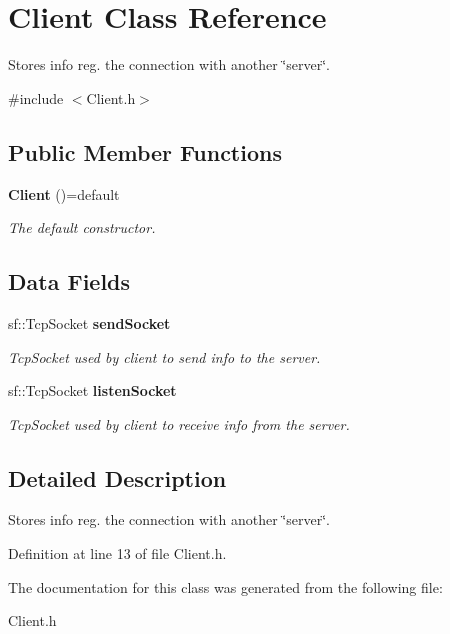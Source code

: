 \section{Client Class Reference}
\label{classClient}


Stores info reg. the connection with another \char`\"{}server\char`\"{}.  




{\ttfamily \#include $<$Client.\+h$>$}

\subsection*{Public Member Functions}
\begin{DoxyCompactItemize}
\item 
{\bf Client} ()=default\label{classClient_ac13ad1e98c47db57ce0823dc735261cd}

\begin{DoxyCompactList}\small\item\em The default constructor. \end{DoxyCompactList}\end{DoxyCompactItemize}
\subsection*{Data Fields}
\begin{DoxyCompactItemize}
\item 
sf\+::\+Tcp\+Socket {\bf send\+Socket}\label{classClient_a08b3297842eb2b464d275ef591f9cc73}

\begin{DoxyCompactList}\small\item\em Tcp\+Socket used by client to send info to the server. \end{DoxyCompactList}\item 
sf\+::\+Tcp\+Socket {\bf listen\+Socket}\label{classClient_a09b45ef7a1057f3d3fbb38be8bb46db1}

\begin{DoxyCompactList}\small\item\em Tcp\+Socket used by client to receive info from the server. \end{DoxyCompactList}\end{DoxyCompactItemize}


\subsection{Detailed Description}
Stores info reg. the connection with another \char`\"{}server\char`\"{}. 

Definition at line 13 of file Client.\+h.



The documentation for this class was generated from the following file\+:\begin{DoxyCompactItemize}
\item 
Client.\+h\end{DoxyCompactItemize}
